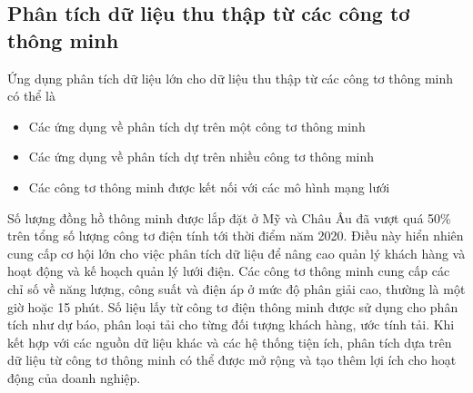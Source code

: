 \documentclass[utf8]{frontiersSCNS} %
\begin{document}
\subsection{Phân tích dữ liệu thu thập từ các công tơ thông minh}

Ứng dụng phân tích dữ liệu lớn cho dữ liệu thu thập từ các công tơ thông minh có thể là
\begin{itemize}
\item Các ứng dụng về phân tích dự trên một công tơ thông minh
\item Các ứng dụng về phân tích dự trên nhiều công tơ thông minh
\item Các công tơ thông minh được kết nối với các mô hình mạng lưới
\end{itemize}

Số lượng đồng hồ thông minh được lắp đặt ở Mỹ và Châu Âu đã vượt quá 50\% trên tổng số lượng công tơ điện tính tới thời điểm năm 2020. Điều này hiển nhiên cung cấp cơ hội lớn cho việc phân tích dữ liệu để nâng cao quản lý khách hàng và hoạt động và kế hoạch quản lý lưới điện. Các công tơ thông minh cung cấp các chỉ số về năng lượng, công suất và điện áp ở mức độ phân giải cao, thường là một giờ hoặc 15 phút. Số liệu lấy từ công tơ điện thông minh được sử dụng cho phân tích như dự báo, phân loại tải cho từng đối tượng khách hàng, ước tính tải. Khi kết hợp với các nguồn dữ liệu khác và các hệ thống tiện ích, phân tích dựa trên dữ liệu từ công tơ thông minh có thể được mở rộng và tạo thêm lợi ích cho hoạt động của doanh nghiệp. %



\end{document}
